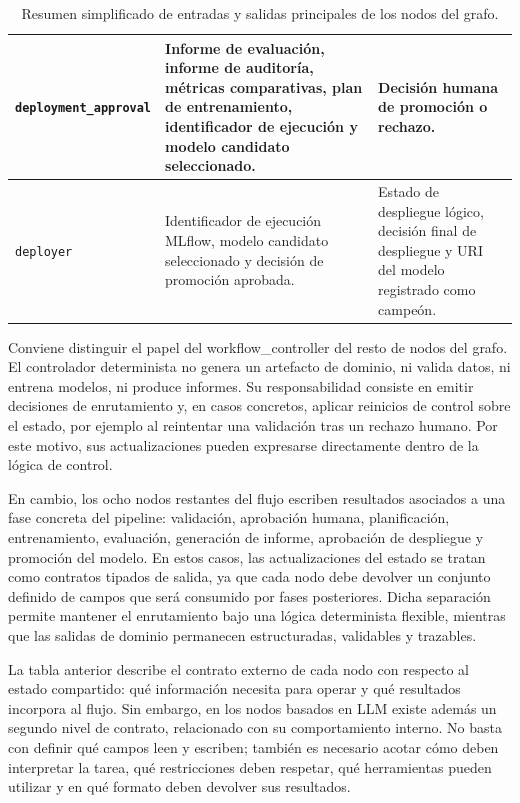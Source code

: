 \documentclass[12pt,a4paper]{article}
\theoremstyle{plain}
\begin{document}
\begin{table}[htbp]
\begin{tabularx}{\linewidth}{>{\RaggedRight\arraybackslash}p{3.8cm} >{\RaggedRight\arraybackslash}X >{\RaggedRight\arraybackslash}X}
\texttt{deployment\_approval} & Informe de evaluación, informe de auditoría, métricas comparativas, plan de entrenamiento, identificador de ejecución y modelo candidato seleccionado. & Decisión humana de promoción o rechazo. \\\hline
\texttt{deployer} & Identificador de ejecución MLflow, modelo candidato seleccionado y decisión de promoción aprobada. & Estado de despliegue lógico, decisión final de despliegue y URI del modelo registrado como campeón. \\\hline
\end{tabularx}
\caption{Resumen simplificado de entradas y salidas principales de los nodos del grafo.}
\label{tab:nodos-estado}
\end{table}

\newpage

Conviene distinguir el papel del workflow\_controller del resto de nodos del grafo. El controlador determinista no genera un artefacto de dominio, ni valida datos, ni entrena modelos, ni produce informes. Su responsabilidad consiste en emitir decisiones de enrutamiento y, en casos concretos, aplicar reinicios de control sobre el estado, por ejemplo al reintentar una validación tras un rechazo humano. Por este motivo, sus actualizaciones pueden expresarse directamente dentro de la lógica de control.

En cambio, los ocho nodos restantes del flujo escriben resultados asociados a una fase concreta del pipeline: validación, aprobación humana, planificación, entrenamiento, evaluación, generación de informe, aprobación de despliegue y promoción del modelo. En estos casos, las actualizaciones del estado se tratan como contratos tipados de salida, ya que cada nodo debe devolver un conjunto definido de campos que será consumido por fases posteriores. Dicha separación permite mantener el enrutamiento bajo una lógica determinista flexible, mientras que las salidas de dominio permanecen estructuradas, validables y trazables.

La tabla anterior describe el contrato externo de cada nodo con respecto al estado compartido: qué información necesita para operar y qué resultados incorpora al flujo. Sin embargo, en los nodos basados en LLM existe además un segundo nivel de contrato, relacionado con su comportamiento interno. No basta con definir qué campos leen y escriben; también es necesario acotar cómo deben interpretar la tarea, qué restricciones deben respetar, qué herramientas pueden utilizar y en qué formato deben devolver sus resultados.
\end{document}
